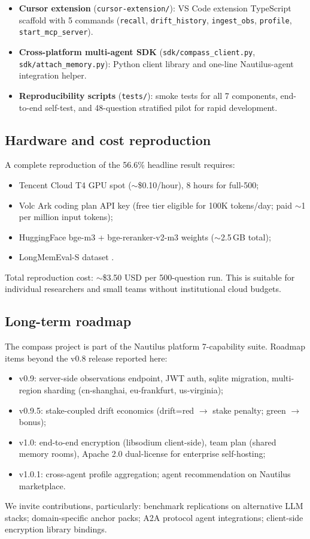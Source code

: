 \begin{itemize}
\item \textbf{Cursor extension} (\texttt{cursor-extension/}): VS Code
   extension TypeScript scaffold with 5 commands (\texttt{recall},
   \texttt{drift\_history}, \texttt{ingest\_obs}, \texttt{profile},
   \texttt{start\_mcp\_server}).

\item \textbf{Cross-platform multi-agent SDK} (\texttt{sdk/compass\_client.py},
   \texttt{sdk/attach\_memory.py}): Python client library and one-line
   Nautilus-agent integration helper.

\item \textbf{Reproducibility scripts} (\texttt{tests/}): smoke tests for
   all 7 components, end-to-end self-test, and 48-question stratified
   pilot for rapid development.

\end{itemize}

\subsection{Hardware and cost reproduction}

A complete reproduction of the 56.6\% headline result requires:

\begin{itemize}
\item Tencent Cloud T4 GPU spot (\(\sim\)\$0.10/hour), 8 hours for full-500;
\item Volc Ark coding plan API key (free tier eligible for 100K
   tokens/day; paid \(\sim\)\cny{}1 per million input tokens);
\item HuggingFace bge-m3 + bge-reranker-v2-m3 weights (\(\sim\)2.5\,GB total);
\item LongMemEval-S dataset \citep{wu2024longmemeval}.
\end{itemize}

Total reproduction cost: \(\sim\)\$3.50 USD per 500-question run. This
is suitable for individual researchers and small teams without
institutional cloud budgets.

\subsection{Long-term roadmap}

The compass project is part of the Nautilus platform 7-capability
suite. Roadmap items beyond the v0.8 release reported here:

\begin{itemize}
\item v0.9: server-side observations endpoint, JWT auth, sqlite migration,
   multi-region sharding (cn-shanghai, eu-frankfurt, us-virginia);
\item v0.9.5: stake-coupled drift economics
   (drift=red \(\to\) stake penalty; green \(\to\) bonus);
\item v1.0: end-to-end encryption (libsodium client-side), team plan
   (shared memory rooms), Apache 2.0 dual-license for enterprise self-hosting;
\item v1.0.1: cross-agent profile aggregation; agent recommendation
   on Nautilus marketplace.
\end{itemize}

We invite contributions, particularly:
benchmark replications on alternative LLM stacks;
domain-specific anchor packs;
A2A protocol agent integrations;
client-side encryption library bindings.

